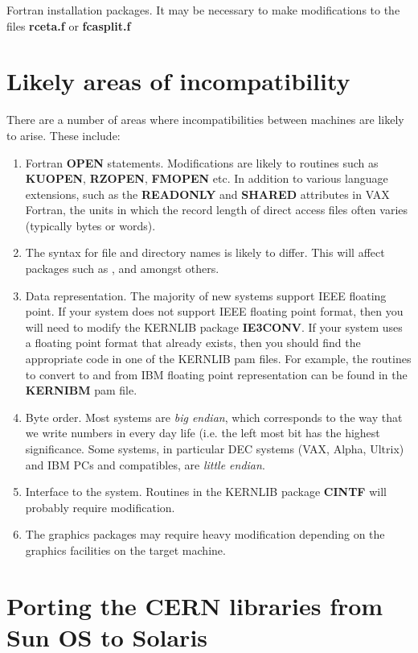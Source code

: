 Fortran installation packages. It may be necessary to make modifications
to the files {\bf rceta.f} or {\bf fcasplit.f}

\section{Likely areas of incompatibility}

There are a number of areas where incompatibilities between machines are likely
to arise. These include:

\begin{enumerate}
\item
Fortran {\bf OPEN} statements. Modifications are likely to routines such
as {\bf KUOPEN}, {\bf RZOPEN}, {\bf FMOPEN} etc. In addition to various
language extensions, such as the {\bf READONLY} and {\bf SHARED}
attributes in VAX Fortran, the units in which the record length of 
direct access files often varies (typically bytes or words).
\item
The syntax for file and directory names is likely to differ.
This will affect packages such as \CSPACK{}, \FATMEN{} and \HEPDB{}
amongst others.  
\item
Data representation. The majority of new systems support IEEE floating
point. If your system does not support IEEE floating point format,
then you will need to modify the KERNLIB package {\bf IE3CONV}.
If your system uses a floating point format that already exists,
then you should find the appropriate code in one of the KERNLIB 
pam files. For example, the routines to convert to and from IBM
floating point representation can be found in the {\bf KERNIBM}
pam file.
\item
Byte order. Most systems are {\it big endian}, which corresponds
to the way that we write numbers in every day life (i.e. the
left most bit has the highest significance. Some systems,
in particular DEC systems (VAX, Alpha, Ultrix) and IBM PCs
and compatibles, are {\it little endian}.
\item
Interface to the system. Routines in the KERNLIB package
{\bf CINTF} will probably require modification.
\item
The graphics packages may require heavy modification depending
on the graphics facilities on the target machine.
\end{enumerate}

\section{Porting the CERN libraries from Sun OS to Solaris}

